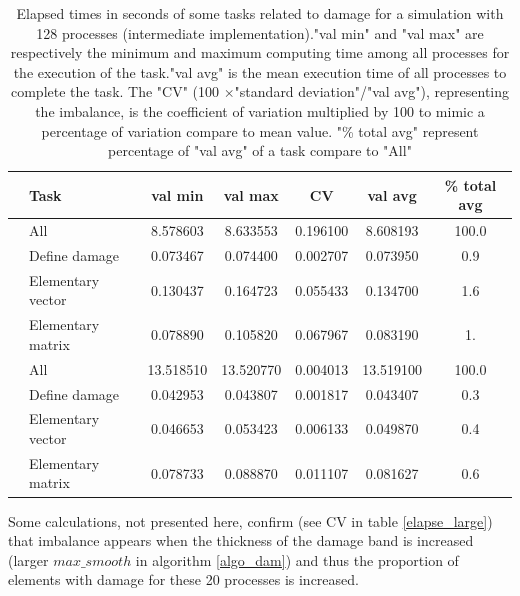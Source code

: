 \documentclass[12pt]{article}
\newcommand{\f}[1]{FEniCSx#1}
\begin{document}
\begin{table}\footnotesize 
	\begin{tabular}{|c|l|c|c|c|c|c|}
		\cline{2-7}
		\multicolumn{1}{c|}{} & Task & val min & val max &CV& val avg & \% total avg \\ \hline
		\multirow{4}{*}{\rotatebox{90}{ MFEM}}      &  All & 8.578603 & 8.633553& 0.196100 & 8.608193 & 100.0 \\ \cline{2-7} 
		&  Define damage & 0.073467 & 0.074400 &0.002707& 0.073950 & 0.9 \\  \cline{2-7} 
		&  Elementary vector & 0.130437   & 0.164723  & 0.055433 &      0.134700 &          1.6 \\ \cline{2-7} 
		&  Elementary matrix & 0.078890  &  0.105820 & 0.067967& 0.083190 & 1. \\ \hline
		\multirow{4}{*}{\rotatebox{90}{\f{}}}      & All  & 13.518510 &     13.520770 &     0.004013 &     13.519100  & 100.0 \\ \cline{2-7} 
		&  Define damage & 0.042953&     0.043807&   0.001817 & 0.043407 &         0.3  \\ \cline{2-7} 
		&  Elementary vector & 0.046653 &      0.053423       &     0.006133 &      0.049870 &          0.4\\ \cline{2-7} 
		&  Elementary matrix & 0.078733 &     0.088870 &      0.011107 &      0.081627 &          0.6 \\\hline
	\end{tabular}
\caption{Elapsed times in seconds of some tasks related to damage for a simulation  with 128 processes (intermediate implementation)."val min" and "val max" are respectively the minimum and maximum computing time among all processes for the execution of the task."val avg" is the mean execution time of all processes to complete the task. The "CV" (100 $\times$"standard deviation"/"val avg"), representing the imbalance, is the coefficient of variation  multiplied by 100  to mimic a percentage of variation compare to mean value. "\% total avg" represent percentage of "val avg" of a task compare to "All"\label{elapse}}
\end{table}
Some calculations, not presented here, confirm (see CV in  table \ref{elapse_large}) that imbalance appears when the thickness of the damage band is increased (larger $max\_smooth$ in algorithm \ref{algo_dam}) and thus the proportion of elements with damage for these 20 processes is increased.
\end{document}
